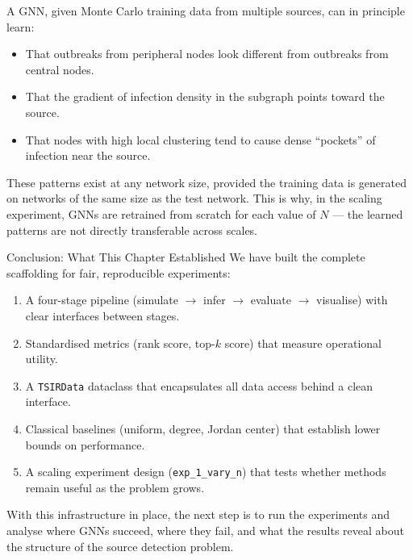 A GNN, given Monte Carlo training data from multiple sources, can in principle learn:
\begin{itemize}
    \item That outbreaks from peripheral nodes look different from outbreaks from central nodes.
    \item That the gradient of infection density in the subgraph points toward the source.
    \item That nodes with high local clustering tend to cause dense ``pockets'' of infection near the source.
\end{itemize}

These patterns exist at any network size, provided the training data is generated on networks of the same size as the test network. This is why, in the scaling experiment, GNNs are retrained from scratch for each value of $N$ --- the learned patterns are not directly transferable across scales.

\begin{keyinsight}{Conclusion: What This Chapter Established}
We have built the complete scaffolding for fair, reproducible experiments:

\begin{enumerate}
    \item A four-stage pipeline (simulate $\to$ infer $\to$ evaluate $\to$ visualise) with clear interfaces between stages.
    \item Standardised metrics (rank score, top-$k$ score) that measure operational utility.
    \item A \texttt{TSIRData} dataclass that encapsulates all data access behind a clean interface.
    \item Classical baselines (uniform, degree, Jordan center) that establish lower bounds on performance.
    \item A scaling experiment design (\texttt{exp\_1\_vary\_n}) that tests whether methods remain useful as the problem grows.
\end{enumerate}

With this infrastructure in place, the next step is to run the experiments and analyse where GNNs succeed, where they fail, and what the results reveal about the structure of the source detection problem.
\end{keyinsight}
